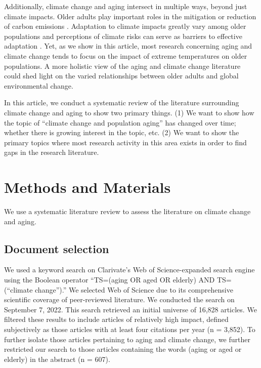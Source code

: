 \documentclass[12pt]{article}
\begin{document}
Additionally, climate change and aging intersect in multiple ways,
beyond just climate impacts. Older adults play important roles in the
mitigation or reduction of carbon emissions
\citep{oneill_global_2010, buchs_who_2013}. Adaptation to climate
impacts greatly vary among older populations
\citep{huang_is_2011, guo_high_2012} and perceptions of climate risks
can serve as barriers to effective adaptation
\citep{hansen_perceptions_2011, abrahamson_perceptions_2008}. Yet, as we
show in this article, most research concerning aging and climate change
tends to focus on the impact of extreme temperatures on older
populations. A more holistic view of the aging and climate change
literature could shed light on the varied relationships between older
adults and global environmental change.

In this article, we conduct a systematic review of the literature
surrounding climate change and aging to show two primary things. (1) We
want to show how the topic of ``climate change and population aging''
has changed over time; whether there is growing interest in the topic,
etc. (2) We want to show the primary topics where most research activity
in this area exists in order to find gaps in the research literature.

\hypertarget{methods-and-materials}{%
\section{Methods and Materials}\label{methods-and-materials}}

We use a systematic literature review to assess the literature on
climate change and aging.

\hypertarget{document-selection}{%
\subsection{Document selection}\label{document-selection}}

We used a keyword search on Clarivate's Web of Science-expanded search
engine using the Boolean operator ``TS=(aging OR aged OR elderly) AND
TS=(``climate change'').'' We selected Web of Science due to its
comprehensive scientific coverage of peer-reviewed literature. We
conducted the search on September 7, 2022. This search retrieved an
initial universe of 16,828 articles. We filtered these results to
include articles of relatively high impact, defined subjectively as
those articles with at least four citations per year (n = 3,852). To
further isolate those articles pertaining to aging and climate change,
we further restricted our search to those articles containing the words
(aging or aged or elderly) in the abstract (n = 607).
\end{document}
